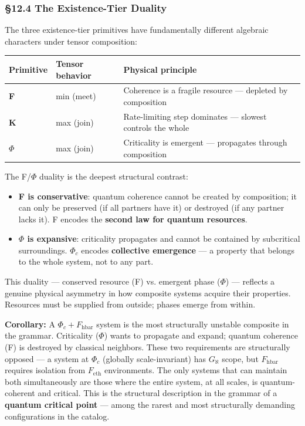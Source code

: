 \documentclass[12pt,a4paper]{article}
\newcommand{\pilcrow}{\S}
\begin{document}
\subsubsection{\pilcrow{}12.4 The Existence-Tier Duality}

The three existence-tier primitives have fundamentally different algebraic characters under tensor composition:

\begin{table}[htbp]
\centering
\small
{}
\begin{tabularx}{\textwidth}{>{\centering\arraybackslash}X >{\centering\arraybackslash}X >{\centering\arraybackslash}X}
\toprule
\rowcolor{gray!25}\textbf{Primitive} & \textbf{Tensor behavior} & \textbf{Physical principle} \\
\midrule
\rowcolors{1}{white}{gray!10}
\textbf{F} & min (meet) & Coherence is a fragile resource --- depleted by composition \\
\textbf{K} & max (join) & Rate-limiting step dominates --- slowest controls the whole \\
\textbf{$\Phi$} & max (join) & Criticality is emergent --- propagates through composition \\
\bottomrule
\end{tabularx}
\end{table}

The F/$\Phi$ duality is the deepest structural contrast:

\begin{itemize}
    \item \textbf{F is conservative}: quantum coherence cannot be created by composition; it can only be preserved (if all partners have it) or destroyed (if any partner lacks it). F encodes the \textbf{second law for quantum resources}.
    \item \textbf{$\Phi$ is expansive}: criticality propagates and cannot be contained by subcritical surroundings. $\Phi_c$ encodes \textbf{collective emergence} --- a property that belongs to the whole system, not to any part.
\end{itemize}

This duality --- conserved resource (F) vs. emergent phase ($\Phi$) --- reflects a genuine physical asymmetry in how composite systems acquire their properties. Resources must be supplied from outside; phases emerge from within.

\textbf{Corollary:} A $\Phi_c + F_{\text{hbar}}$ system is the most structurally unstable composite in the grammar. Criticality ($\Phi$) wants to propagate and expand; quantum coherence (F) is destroyed by classical neighbors. These two requirements are structurally opposed --- a system at $\Phi_c$ (globally scale-invariant) has $G_{\aleph}$ scope, but $F_{\text{hbar}}$ requires isolation from $F_{\text{eth}}$ environments. The only systems that can maintain both simultaneously are those where the entire system, at all scales, is quantum-coherent and critical. This is the structural description in the grammar of a \textbf{quantum critical point} --- among the rarest and most structurally demanding configurations in the catalog.
\end{document}
